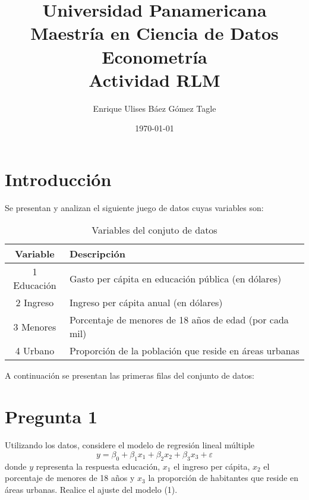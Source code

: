 \documentclass[10pt]{article}
\title{Universidad Panamericana \\ Maestría en Ciencia de Datos \\ Econometría \\ \vspace{0.5cm} Actividad RLM}
\author{Enrique Ulises Báez Gómez Tagle}
\date{\today}
\begin{document}
\maketitle

\tableofcontents

\newpage
\section{Introducción}
Se presentan y analizan el siguiente juego de datos cuyas variables son:
\begin{table}[H]
    \centering
    \begin{tabular}{|c|l|}
        \hline
        \textbf{Variable} & \textbf{Descripción} \\
        \hline
        1 Educación & Gasto per cápita en educación pública (en dólares) \\
        \hline
        2 Ingreso & Ingreso per cápita anual (en dólares) \\
        \hline
        3 Menores & Porcentaje de menores de 18 años de edad (por cada mil) \\
        \hline
        4 Urbano & Proporción de la población que reside en áreas urbanas \\
        \hline
    \end{tabular}
    \caption{Variables del conjuto de datos}
\end{table}
A continuación se presentan las primeras filas del conjunto de datos:

\section{Pregunta 1}
Utilizando los datos, considere el modelo de regresión lineal múltiple 
\[
y = \beta_0 + \beta_1 x_1 + \beta_2 x_2 + \beta_3 x_3 + \varepsilon
\]
donde $y$ representa la respuesta educación, $x_1$ el ingreso per cápita, $x_2$ el porcentaje de menores de 18 años y $x_3$ la proporción de habitantes que reside en áreas urbanas. 
Realice el ajuste del modelo (1). \\
\end{document}
